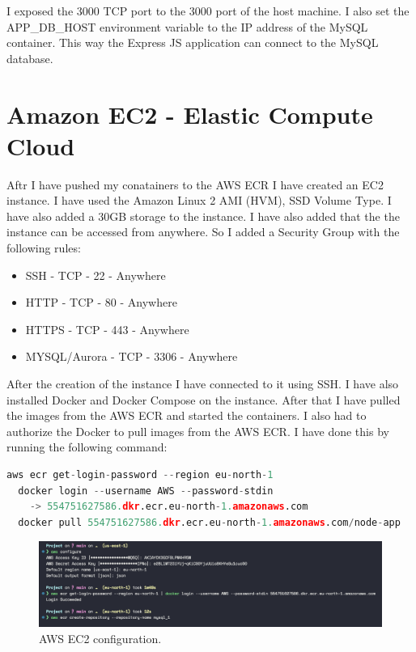 \documentclass[11pt,a4paper,oneside]{report}
\begin{document}
I exposed the 3000 TCP port to the 3000 port of the host machine. I also set the APP\_DB\_HOST environment variable to the IP address of the MySQL container.
This way the Express JS application can connect to the MySQL database.

\section{Amazon EC2 - Elastic Compute Cloud}
Aftr I have pushed my conatainers to the AWS ECR I have created an EC2 instance. I have used the Amazon Linux 2 AMI (HVM), SSD Volume Type. I have also added a 30GB storage to the instance. I have also added that the the instance can be accessed from anywhere. So I added a Security Group with the following rules:
\begin{itemize}
  \item SSH - TCP - 22 - Anywhere
  \item HTTP - TCP - 80 - Anywhere
  \item HTTPS - TCP - 443 - Anywhere
  \item MYSQL/Aurora - TCP - 3306 - Anywhere
\end{itemize}

After the creation of the instance I have connected to it using SSH. I have also installed Docker and Docker Compose on the instance. After that I have pulled the images from the AWS ECR and started the containers. I also had to authorize the Docker to pull images from the AWS ECR. I have done this by running the following command:
\begin{lstlisting}[language=Python,basicstyle=\ttfamily\small,]
  aws ecr get-login-password --region eu-north-1 
  docker login --username AWS --password-stdin 
    -> 554751627586.dkr.ecr.eu-north-1.amazonaws.com
  docker pull 554751627586.dkr.ecr.eu-north-1.amazonaws.com/node-app
\end{lstlisting}

\begin{figure}[!ht]
  \centering
  \includegraphics[scale=0.5]{aws_configure_ec2.png}
  \caption{AWS EC2 configuration.}
  \label{fig:TexnicCenter}
\end{figure}
\end{document}
